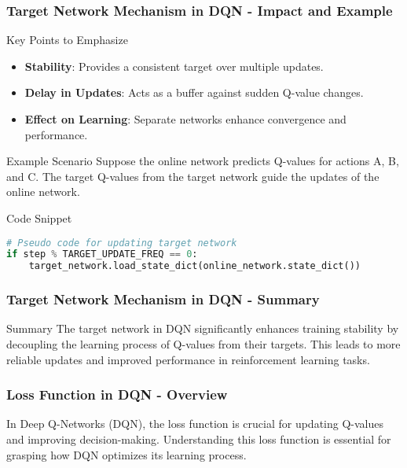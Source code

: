 \documentclass{beamer}
\begin{document}
\begin{frame}[fragile]
    \frametitle{Target Network Mechanism in DQN - Impact and Example}
    \begin{block}{Key Points to Emphasize}
        \begin{itemize}
            \item \textbf{Stability}: Provides a consistent target over multiple updates.
            \item \textbf{Delay in Updates}: Acts as a buffer against sudden Q-value changes.
            \item \textbf{Effect on Learning}: Separate networks enhance convergence and performance.
        \end{itemize}
    \end{block}

    \begin{block}{Example Scenario}
        Suppose the online network predicts Q-values for actions A, B, and C. The target Q-values from the target network guide the updates of the online network.
    \end{block}

    \begin{block}{Code Snippet}
        \begin{lstlisting}[language=Python]
# Pseudo code for updating target network
if step % TARGET_UPDATE_FREQ == 0:
    target_network.load_state_dict(online_network.state_dict())
        \end{lstlisting}
    \end{block}
\end{frame}

\begin{frame}[fragile]
    \frametitle{Target Network Mechanism in DQN - Summary}
    \begin{block}{Summary}
        The target network in DQN significantly enhances training stability by decoupling the learning process of Q-values from their targets.
        This leads to more reliable updates and improved performance in reinforcement learning tasks.
    \end{block}
\end{frame}

\begin{frame}[fragile]
    \frametitle{Loss Function in DQN - Overview}
    In Deep Q-Networks (DQN), the loss function is crucial for updating Q-values and improving decision-making. 
    Understanding this loss function is essential for grasping how DQN optimizes its learning process.
\end{frame}
\end{document}
